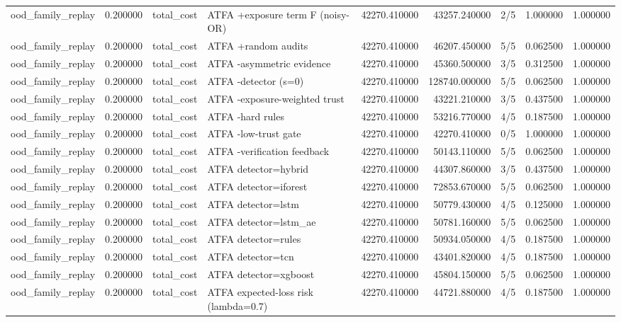 \begin{tabular}{lrllrrlrr}
ood\_family\_replay & 0.200000 & total\_cost & ATFA +exposure term F (noisy-OR) & 42270.410000 & 43257.240000 & 2/5 & 1.000000 & 1.000000 \\
ood\_family\_replay & 0.200000 & total\_cost & ATFA +random audits & 42270.410000 & 46207.450000 & 5/5 & 0.062500 & 1.000000 \\
ood\_family\_replay & 0.200000 & total\_cost & ATFA -asymmetric evidence & 42270.410000 & 45360.500000 & 3/5 & 0.312500 & 1.000000 \\
ood\_family\_replay & 0.200000 & total\_cost & ATFA -detector (s=0) & 42270.410000 & 128740.000000 & 5/5 & 0.062500 & 1.000000 \\
ood\_family\_replay & 0.200000 & total\_cost & ATFA -exposure-weighted trust & 42270.410000 & 43221.210000 & 3/5 & 0.437500 & 1.000000 \\
ood\_family\_replay & 0.200000 & total\_cost & ATFA -hard rules & 42270.410000 & 53216.770000 & 4/5 & 0.187500 & 1.000000 \\
ood\_family\_replay & 0.200000 & total\_cost & ATFA -low-trust gate & 42270.410000 & 42270.410000 & 0/5 & 1.000000 & 1.000000 \\
ood\_family\_replay & 0.200000 & total\_cost & ATFA -verification feedback & 42270.410000 & 50143.110000 & 5/5 & 0.062500 & 1.000000 \\
ood\_family\_replay & 0.200000 & total\_cost & ATFA detector=hybrid & 42270.410000 & 44307.860000 & 3/5 & 0.437500 & 1.000000 \\
ood\_family\_replay & 0.200000 & total\_cost & ATFA detector=iforest & 42270.410000 & 72853.670000 & 5/5 & 0.062500 & 1.000000 \\
ood\_family\_replay & 0.200000 & total\_cost & ATFA detector=lstm & 42270.410000 & 50779.430000 & 4/5 & 0.125000 & 1.000000 \\
ood\_family\_replay & 0.200000 & total\_cost & ATFA detector=lstm\_ae & 42270.410000 & 50781.160000 & 5/5 & 0.062500 & 1.000000 \\
ood\_family\_replay & 0.200000 & total\_cost & ATFA detector=rules & 42270.410000 & 50934.050000 & 4/5 & 0.187500 & 1.000000 \\
ood\_family\_replay & 0.200000 & total\_cost & ATFA detector=tcn & 42270.410000 & 43401.820000 & 4/5 & 0.187500 & 1.000000 \\
ood\_family\_replay & 0.200000 & total\_cost & ATFA detector=xgboost & 42270.410000 & 45804.150000 & 5/5 & 0.062500 & 1.000000 \\
ood\_family\_replay & 0.200000 & total\_cost & ATFA expected-loss risk (lambda=0.7) & 42270.410000 & 44721.880000 & 4/5 & 0.187500 & 1.000000 \\

\end{tabular}
